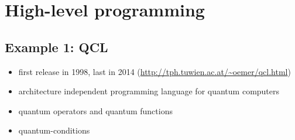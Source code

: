 \documentclass{beamer}
\begin{document}
\begin{frame}{\insertsection}{\insertsubsection}
	
\end{frame}

\begin{frame}{\insertsection}{\insertsubsection}
	
\end{frame}

\begin{frame}{\insertsection}{\insertsubsection}
	
\end{frame}

\section{High-level programming}

\subsection{Example 1: QCL}

\begin{frame}{\insertsection}{\insertsubsection}
	\begin{itemize}
		\item first release in 1998, last in 2014 
		(\url{http://tph.tuwien.ac.at/~oemer/qcl.html})
		\item architecture independent programming language for quantum computers
		\item quantum operators and quantum functions
		\item quantum-conditions
	\end{itemize}
	
\end{frame}

\begin{frame}{\insertsection}{\insertsubsection}
	
\end{frame}
\end{document}
